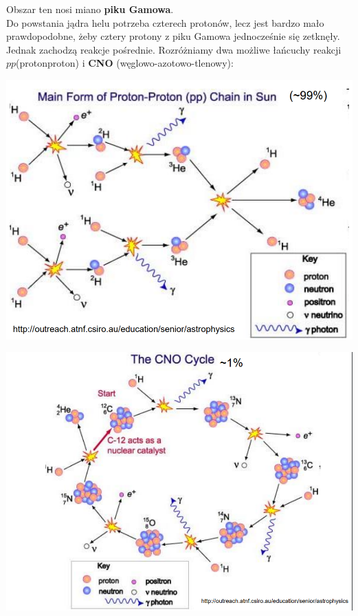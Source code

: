 \documentclass[../index.tex]{subfiles}
\begin{document}
                Obszar ten nosi miano \textbf{piku Gamowa}.\\
                Do powstania jądra helu potrzeba czterech protonów, lecz jest bardzo mało prawdopodobne, żeby cztery protony z piku Gamowa jednocześnie się zetknęły. Jednak zachodzą reakcje pośrednie. Rozróżniamy dwa możliwe łańcuchy reakcji \(pp\)(proton\-proton) i \textbf{CNO} (węglowo-azotowo-tlenowy):
                \begin{center}
                    \includegraphics[width=15cm]{images/ppSynteza.png}
                \end{center}
                \begin{center}
                    \includegraphics[width=15cm]{images/CNOSynteza.png}
                \end{center}
\end{document}

